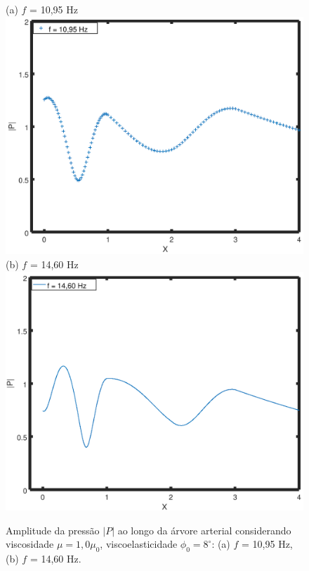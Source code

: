 \documentclass[
        english,			
        brazil			        %
        ,<...>]{abntbibufjf}
\begin{document}
\begin{figure} [!htbp]
	\centering
	(a) $f$ = 10,95 Hz\\
	\includegraphics[scale=0.7]{figure5-result/Figure5_phi_den_f10_95_new.png}\\
	(b) $f$ = 14,60 Hz\\
	\includegraphics[scale=0.7]{figure5-result/Figure5_phi_den_f14_60_new.png}\\
	\caption{Amplitude da pressão $|P|$ ao longo da árvore arterial considerando viscosidade $\mu = 1,0 \mu_0$, viscoelasticidade $\phi_0 = 8^{\circ}$: (a) $f$ = 10,95 Hz, (b) $f$ = 14,60 Hz.}
	\label{fig5b:arterial-tree}%
\end{figure}
\end{document}
